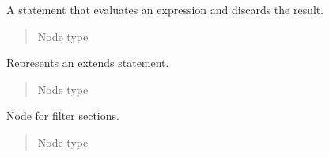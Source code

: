 \documentclass[a4paper,10pt,english]{sphinxmanual}
\begin{document}

\begin{fulllineitems}
\label{extensions:jinja2.nodes.ExprStmt}
A statement that evaluates an expression and discards the result.
\begin{quote}\begin{description}
\item[{Node type}] \leavevmode
{\hyperref[extensions:jinja2.nodes.Stmt]{}}

\end{description}\end{quote}

\end{fulllineitems}


\begin{fulllineitems}
\label{extensions:jinja2.nodes.Extends}
Represents an extends statement.
\begin{quote}\begin{description}
\item[{Node type}] \leavevmode
{\hyperref[extensions:jinja2.nodes.Stmt]{}}

\end{description}\end{quote}

\end{fulllineitems}


\begin{fulllineitems}
\label{extensions:jinja2.nodes.FilterBlock}
Node for filter sections.
\begin{quote}\begin{description}
\item[{Node type}] \leavevmode
{\hyperref[extensions:jinja2.nodes.Stmt]{}}

\end{description}\end{quote}

\end{fulllineitems}
\end{document}

